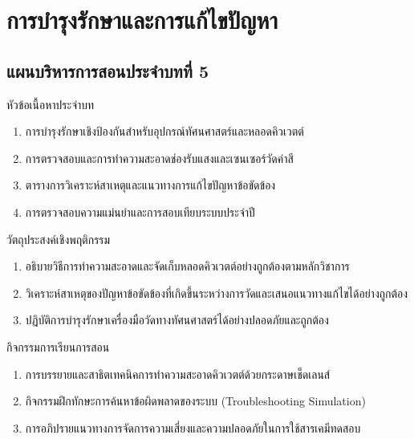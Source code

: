 \chapter{การบำรุงรักษาและการแก้ไขปัญหา}
\label{chap:ch05}

\section*{แผนบริหารการสอนประจำบทที่ 5}

\begin{planbox}{หัวข้อเนื้อหาประจำบท}
\begin{enumerate}[leftmargin=1.5em, itemsep=1pt]
    \item การบำรุงรักษาเชิงป้องกันสำหรับอุปกรณ์ทัศนศาสตร์และหลอดคิวเวตต์
    \item การตรวจสอบและการทำความสะอาดช่องรับแสงและเซนเซอร์วัดค่าสี
    \item ตารางการวิเคราะห์สาเหตุและแนวทางการแก้ไขปัญหาข้อขัดข้อง
    \item การตรวจสอบความแม่นยำและการสอบเทียบระบบประจำปี
\end{enumerate}
\end{planbox}

\begin{planbox}{วัตถุประสงค์เชิงพฤติกรรม}
\begin{enumerate}[leftmargin=1.5em, itemsep=1pt]
    \item อธิบายวิธีการทำความสะอาดและจัดเก็บหลอดคิวเวตต์อย่างถูกต้องตามหลักวิชาการ
    \item วิเคราะห์สาเหตุของปัญหาข้อขัดข้องที่เกิดขึ้นระหว่างการวัดและเสนอแนวทางแก้ไขได้อย่างถูกต้อง
    \item ปฏิบัติการบำรุงรักษาเครื่องมือวัดทางทัศนศาสตร์ได้อย่างปลอดภัยและถูกต้อง
\end{enumerate}
\end{planbox}

\begin{planbox}{กิจกรรมการเรียนการสอน}
\begin{enumerate}[leftmargin=1.5em, itemsep=1pt]
    \item การบรรยายและสาธิตเทคนิคการทำความสะอาดคิวเวตต์ด้วยกระดาษเช็ดเลนส์
    \item กิจกรรมฝึกทักษะการค้นหาข้อผิดพลาดของระบบ (Troubleshooting Simulation)
    \item การอภิปรายแนวทางการจัดการความเสี่ยงและความปลอดภัยในการใช้สารเคมีทดสอบ
\end{enumerate}
\end{planbox}

